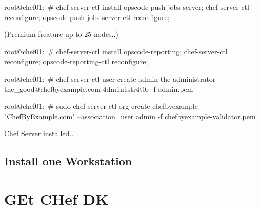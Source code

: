 \begin{codelisting}
\label{code:}
\codecaption{}
\begin{code}
root@chef01:~# chef-server-ctl install opscode-push-jobs-server; chef-server-ctl reconfigure; opscode-push-jobs-server-ctl reconfigure;
\end{code}
\end{codelisting}


(Premium freature up to 25 nodes..)
\begin{codelisting}
\label{code:}
\codecaption{}
\begin{code}
root@chef01:~# chef-server-ctl install opscode-reporting; chef-server-ctl reconfigure; opscode-reporting-ctl reconfigure; 
\end{code}
\end{codelisting}


\begin{codelisting}
\label{code:}
\codecaption{}
\begin{code}
root@chef01:~# chef-server-ctl user-create admin the administrator the_good@chefbyexample.com 4dm1n1str4t0r -f admin.pem
\end{code}
\end{codelisting}


\begin{codelisting}
\label{code:}
\codecaption{}
\begin{code}
root@chef01:~# sudo chef-server-ctl org-create chefbyexample "ChefByExample.com" --association_user admin -f chefbyexample-validator.pem
\end{code}
\end{codelisting}


Chef Server installed..

\section{Install one Workstation}

\chapter{GEt CHef DK}

